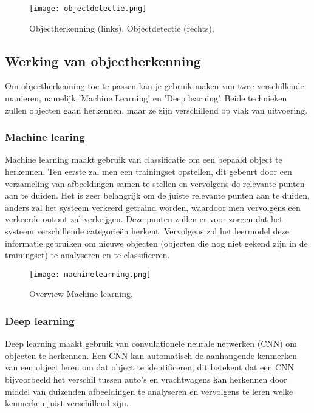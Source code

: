 \begin{figure}[H]
	\centering
	\texttt{[image: objectdetectie.png]}
	\caption{Objectherkenning (links), Objectdetectie (rechts), \autocite{ObjRec2020}}
\end{figure}

\subsection{Werking van objectherkenning}
Om objectherkenning toe te passen kan je gebruik maken van twee verschillende manieren, namelijk 'Machine Learning' en 'Deep learning'. Beide technieken zullen objecten gaan herkennen, maar ze zijn verschillend op vlak van uitvoering.

\subsubsection{Machine learing}
Machine learning maakt gebruik van classificatie om een bepaald object te herkennen. Ten eerste zal men een trainingset opstellen, dit gebeurt door een verzameling van afbeeldingen samen te stellen en vervolgens de relevante punten aan te duiden. Het is zeer belangrijk om de juiste relevante punten aan te duiden, anders zal het systeem verkeerd getraind worden, waardoor men vervolgens een verkeerde output zal verkrijgen. Deze punten zullen er voor zorgen dat het systeem verschillende categorieën herkent. Vervolgens zal het leermodel deze informatie gebruiken om nieuwe objecten (objecten die nog niet gekend zijn in de trainingset) te analyseren en te classificeren. \autocite{ObjRec2020}


\begin{figure}[H]
	\centering
	\texttt{[image: machinelearning.png]}
	\caption{Overview Machine learning, \autocite{ObjRec2020}}
\end{figure}


\subsubsection{Deep learning}
Deep learning maakt gebruik van convulationele neurale netwerken (CNN) om objecten te herkennen. Een CNN kan automatisch de aanhangende kenmerken van een object leren om dat object te identificeren, dit betekent dat een CNN bijvoorbeeld het verschil tussen auto's en vrachtwagens kan herkennen door middel van duizenden afbeeldingen te analyseren en vervolgens te leren welke kenmerken juist verschillend zijn. \autocite{ObjRec2020}

